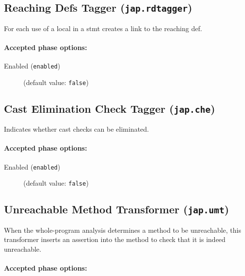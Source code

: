 \documentclass{article}
\begin{document}
\subsection{Reaching Defs Tagger ({\tt jap.rdtagger})}
For each use of a local in a stmt creates a link to the reaching def.

\paragraph{Accepted phase options:} 

\begin{description}

\item[Enabled ({\tt enabled})]
(default value: {\tt false})






\end{description}

\subsection{Cast Elimination Check Tagger ({\tt jap.che})}
Indicates whether cast checks can be eliminated.

\paragraph{Accepted phase options:} 

\begin{description}

\item[Enabled ({\tt enabled})]
(default value: {\tt false})






\end{description}

\subsection{Unreachable Method Transformer ({\tt jap.umt})}
When the whole-program analysis determines a method to be unreachable, this transformer inserts an assertion into the method to check that it is indeed unreachable.

\paragraph{Accepted phase options:} 
\end{document}
